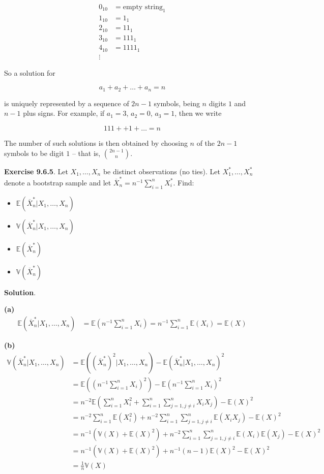 \begin{align}
0_{10} & = \text{empty string}_1 \\
1_{10} & = 1_1 \\
2_{10} & = 11_1 \\
3_{10} & = 111_1 \\
4_{10} & = 1111_1 \\
\vdots
\end{align}

So a solution for

\[a_1 + a_2 + \dots + a_n = n\]

is uniquely represented by a sequence of \(2n - 1\) symbols, being \(n\)
digits \(1\) and \(n - 1\) plus signs. For example, if \(a_1 = 3\),
\(a_2 = 0\), \(a_3 = 1\), then we write

\[ 111 + + 1 + \dots = n \]

The number of such solutions is then obtained by choosing \(n\) of the
\(2n - 1\) symbols to be digit \(1\) -- that is, \(\binom{2n - 1}{n}\).

\textbf{Exercise 9.6.5}. Let \(X_1, \dots, X_n\) be distinct
observations (no ties). Let \(X_1^*, \dots, X_n^*\) denote a bootstrap
sample and let \(\overline{X}_n^* = n^{-1}\sum_{i=1}^nX_i^*\). Find:

\begin{itemize}[tightlist]
\item
  \(\mathbb{E}(\overline{X}_n^* | X_1, \dots, X_n)\)
\item
  \(\mathbb{V}(\overline{X}_n^* | X_1, \dots, X_n)\)
\item
  \(\mathbb{E}(\overline{X}_n^*)\)
\item
  \(\mathbb{V}(\overline{X}_n^*)\)
\end{itemize}

\textbf{Solution}.

\textbf{(a)} \begin{align}
\mathbb{E}(\overline{X}_n^* | X_1, \dots, X_n) &= \mathbb{E}\left(n^{-1}\sum_{i=1}^nX_i\right) = n^{-1}\sum_{i=1}^n \mathbb{E}(X_i) = \mathbb{E}(X)
\end{align}

\textbf{(b)} \begin{align}
\mathbb{V}(\overline{X}_n^* | X_1, \dots, X_n) & =
\mathbb{E}((\overline{X}_n^*)^2 | X_1, \dots, X_n) - \mathbb{E}(\overline{X}_n^* | X_1, \dots, X_n)^2 \\
&= \mathbb{E}\left(\left(n^{-1}\sum_{i=1}^nX_i\right)^2\right) - \mathbb{E}\left(n^{-1}\sum_{i=1}^nX_i\right)^2 \\
&= n^{-2} \mathbb{E}\left(\sum_{i=1}^nX_i^2 + \sum_{i=1}^n \sum_{j=1, j \neq i}^n X_i X_j\right) - \mathbb{E}(X)^2 \\
&= n^{-2} \sum_{i=1}^n \mathbb{E}(X_i^2) + n^{-2} \sum_{i=1}^n \sum_{j=1, j \neq i}^n \mathbb{E}(X_i X_j) - \mathbb{E}(X)^2  \\
&= n^{-1} (\mathbb{V}(X) + \mathbb{E}(X)^2) + n^{-2} \sum_{i=1}^n \sum_{j=1, j \neq i}^n \mathbb{E}(X_i) \mathbb{E}(X_j) - \mathbb{E}(X)^2 \\
&= n^{-1} (\mathbb{V}(X) + \mathbb{E}(X)^2) + n^{-1} (n - 1) \mathbb{E}(X)^2 - \mathbb{E}(X)^2 \\
&= \frac{1}{n}\mathbb{V}(X)
\end{align}


